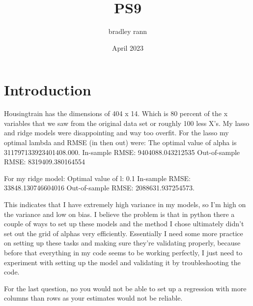 \documentclass{article}
\title{PS9}
\author{bradley rann }
\date{April 2023}
\begin{document}
\maketitle

\section{Introduction}
Housingtrain has the dimensions of 404 x 14. Which is 80 percent of the x variables that we saw from the original data set or roughly 100 less X's.
My lasso and ridge models were disappointing and way too overfit. For the lasso my optimal lambda and RMSE (in then out) were: The optimal value of alpha is 311797133923401408.000.
In-sample RMSE: 9404088.043212535
Out-of-sample RMSE: 8319409.380164554

For my ridge model: Optimal value of l: 0.1
In-sample RMSE: 33848.130746604016
Out-of-sample RMSE: 2088631.937254573.

This indicates that I have extremely high variance in my models, so I'm high on the variance and low on bias. I believe the problem is that in python there a couple of ways to set up these models and the method I chose ultimately didn't set out the grid of alphas very efficiently. Essentially I need some more practice on setting up these tasks and making sure they're validating properly, because before that everything in my code seems to be working perfectly, I just need to experiment with setting up the model and validating it by troubleshooting the code.

For the last question, no you would not be able to set up a regression with more columns than rows as your estimates would not be reliable.
\end{document}

